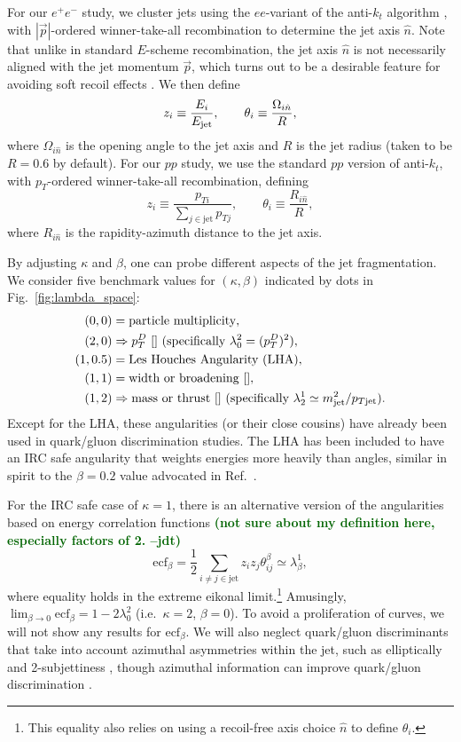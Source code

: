 \documentclass[11pt,letterpaper]{article}
\newcommand{\genang}[2]{{\lambda^{#1}_{#2}}}
\DeclareRobustCommand{\Fig}[1]{Fig.~\ref{#1}}
\DeclareRobustCommand{\Ref}[1]{Ref.~\cite{#1}}
\newcommand{\be}{\begin{equation}}
\newcommand{\ee}{\end{equation}}
\newcommand{\jdt}[1]{\textbf{\textcolor{darkgreen}{(#1 --jdt)}}}
\begin{document}
For our $e^+ e^-$ study, we cluster jets using the $ee$-variant of the anti-$k_t$ algorithm \cite{}, with $|\vec{p}|$-ordered winner-take-all recombination \cite{} to determine the jet axis $\hat{n}$.  Note that unlike in standard $E$-scheme recombination, the jet axis $\hat{n}$ is not necessarily aligned with the jet momentum $\vec{p}$, which turns out to be a desirable feature for avoiding soft recoil effects \cite{}.  We then define
\be
z_i \equiv \frac{E_i}{E_{\rm jet}}, \qquad \theta_i \equiv \frac{\Omega_{i \hat{n}}}{R},
\ee
where $\Omega_{i \hat{n}}$ is the opening angle to the jet axis and $R$ is the jet radius (taken to be $R = 0.6$ by default).  For our $pp$ study, we use the standard $pp$ version of anti-$k_t$, with $p_T$-ordered winner-take-all recombination, defining
\be
z_i \equiv \frac{p_{Ti}}{\sum_{j \in \text{jet}} p_{Tj}}, \qquad \theta_i \equiv \frac{R_{i \hat{n}}}{R},
\ee
where $R_{i \hat{n}}$ is the rapidity-azimuth distance to the jet axis.

By adjusting $\kappa$ and $\beta$, one can probe different aspects of the jet fragmentation.  We consider five benchmark values for $(\kappa, \beta)$ indicated by dots in \Fig{fig:lambda_space}:
\be
\label{eq:benchmarkang}
\begin{aligned}
(0,0) &= \text{particle multiplicity},\\
(2,0) &\Rightarrow p_T^D \text{  \cite{} (specifically $\genang{2}{0} = (p_T^D)^2$)},\\
(1,0.5) & = \text{Les Houches Angularity (LHA)},\\
(1,1) &= \text{width or broadening \cite{}} ,\\
(1,2) & \Rightarrow \text{mass or thrust \cite{} (specifically $\genang{1}{2} \simeq m_{\rm jet}^2 / p_{T{\rm jet}}$)}.
\end{aligned}
\ee
Except for the LHA, these angularities (or their close cousins) have already been used in quark/gluon discrimination studies.  The LHA has been included to have an IRC safe angularity that weights energies more heavily than angles, similar in spirit to the $\beta = 0.2$ value advocated in \Ref{}.

For the IRC safe case of $\kappa = 1$, there is an alternative version of the angularities based on energy correlation functions \jdt{not sure about my definition here, especially factors of 2.}
\be
\text{ecf}_\beta = \frac{1}{2}\sum_{i \not= j \in \text{jet}} z_i z_j \theta_{ij}^\beta \simeq \genang{1}{\beta},
\ee
where equality holds in the extreme eikonal limit.\footnote{This equality also relies on using a recoil-free axis choice $\hat{n}$ to define $\theta_i$.}  Amusingly, $\lim_{\beta \to 0} \text{ecf}_\beta = 1 - 2 \genang{2}{0}$ \cite{} (i.e.~$\kappa = 2$, $\beta = 0$).  To avoid a proliferation of curves, we will not show any results for $\text{ecf}_\beta$.  We will also neglect quark/gluon discriminants that take into account azimuthal asymmetries within the jet, such as elliptically \cite{} and 2-subjettiness \cite{}, though azimuthal information can improve quark/gluon discrimination \cite{}.
\end{document}
